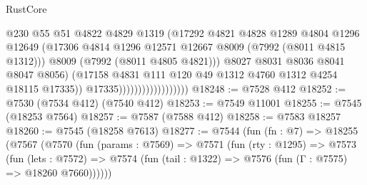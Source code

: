 \begin{lexlean}{RustCore}
\begin{coremodule}
                                            @230
                                            @55
                                            @51
                                            @4822
                                            @4829
                                            @1319
                                            (@17292
                                              @4821
                                              @4828
                                              @1289
                                              @4804
                                              @1296
                                              @12649
                                              (@17306
                                                @4814
                                                @1296
                                                @12571
                                                @12667
                                                @8009
                                                (@7992 (@8011 @4815 @1312)))
                                              @8009
                                              (@7992 (@8011 @4805 @4821)))
                                            @8027
                                            @8031
                                            @8036
                                            @8041
                                            @8047
                                            @8056)
                                          (@17158
                                            @4831
                                            @111
                                            @120
                                            @49
                                            @1312
                                            @4760
                                            @1312
                                            @4254
                                            @18115
                                            @17335))
                                        @17335))))))))))))))))))
@18248 := @7528 @412
@18252 := @7530 (@7534 @412) (@7540 @412)
@18253 := @7549 @11001
@18255 := @7545 (@18253 @7564)
@18257 := @7587 (@7588 @412)
@18258 := @7583 @18257
@18260 := @7545 (@18258 @7613)
@18277 := @7544
    (fun (fn : @7) =>
    @18255
      (@7567
        (@7570
          (fun (params : @7569) =>
          @7571
            (fun (rty : @1295) =>
            @7573
              (fun (lets : @7572) =>
              @7574 (fun (tail : @1322) => @7576 (fun (Γ : @7575) => @18260 @7660))))))

\end{coremodule}
\end{lexlean}
